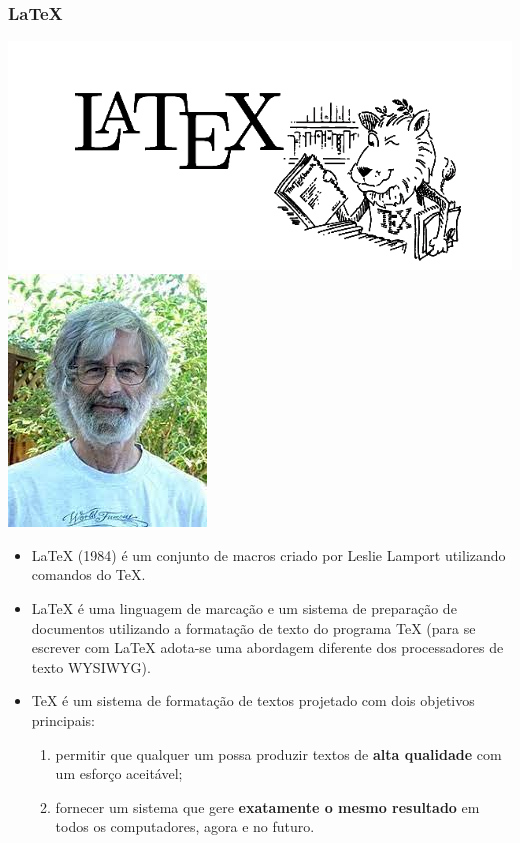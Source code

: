 \begin{frame}
\frametitle{\LaTeX{}}

\includegraphics[width=0.5\linewidth]{figures/lion01.png}\hfill\includegraphics[width=0.15\linewidth]{figures/lamport.jpg}
\begin{itemize}
  \item \LaTeX{} (1984) é um conjunto de macros criado por Leslie Lamport utilizando comandos do \TeX{}.
  \item \LaTeX{} é uma linguagem de marcação e um sistema de preparação de documentos utilizando a formatação de texto do programa \TeX{} (para se escrever com \LaTeX{} adota-se uma abordagem diferente dos processadores de texto WYSIWYG).
  \item \TeX{} é um sistema de formatação de textos projetado com dois objetivos principais:
  \begin{enumerate}
      \item permitir que qualquer um possa produzir textos de \textbf{alta qualidade} com um esforço aceitável;
      \item fornecer um sistema que gere \textbf{exatamente o mesmo resultado} em todos os computadores, agora e no futuro.
  \end{enumerate}
\end{itemize}
\end{frame}



